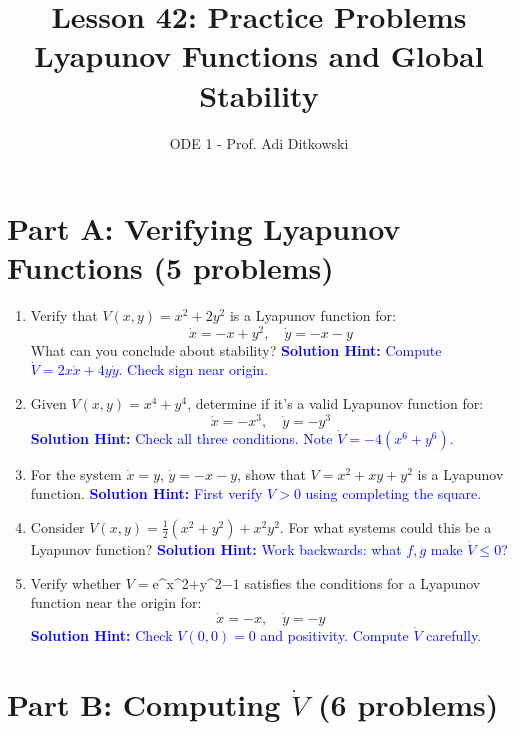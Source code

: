 \documentclass[12pt]{article}
\title{Lesson 42: Practice Problems\\
\large Lyapunov Functions and Global Stability}
\author{ODE 1 - Prof. Adi Ditkowski}
\date{}
\newcommand{\solution}[1]{\textcolor{blue}{\textbf{Solution Hint:} #1}}
\begin{document}
\maketitle

\section*{Part A: Verifying Lyapunov Functions (5 problems)}

\begin{enumerate}
\item Verify that $V(x,y) = x^2 + 2y^2$ is a Lyapunov function for:
$$\dot{x} = -x + y^2, \quad \dot{y} = -x - y$$
What can you conclude about stability?
\solution{Compute $\dot{V} = 2x\dot{x} + 4y\dot{y}$. Check sign near origin.}

\item Given $V(x,y) = x^4 + y^4$, determine if it's a valid Lyapunov function for:
$$\dot{x} = -x^3, \quad \dot{y} = -y^3$$
\solution{Check all three conditions. Note $\dot{V} = -4(x^6 + y^6)$.}

\item For the system $\dot{x} = y$, $\dot{y} = -x - y$, show that $V = x^2 + xy + y^2$ is a Lyapunov function.
\solution{First verify $V > 0$ using completing the square.}

\item Consider $V(x,y) = \frac{1}{2}(x^2 + y^2) + x^2y^2$. For what systems could this be a Lyapunov function?
\solution{Work backwards: what $f,g$ make $\dot{V} \leq 0$?}

\item Verify whether $V = $e^{x^2+y^2}$ - 1$ satisfies the conditions for a Lyapunov function near the origin for:
$$\dot{x} = -x, \quad \dot{y} = -y$$
\solution{Check $V(0,0) = 0$ and positivity. Compute $\dot{V}$ carefully.}
\end{enumerate}

\section*{Part B: Computing $\dot{V}$ (6 problems)}
\end{document}
